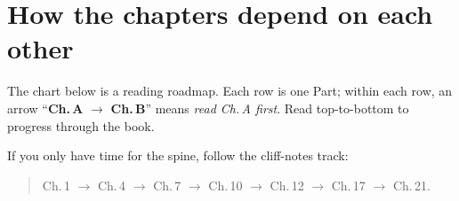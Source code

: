 
\chapter*{How the chapters depend on each other}

The chart below is a reading roadmap. Each row is one Part; within each row, an arrow ``\textbf{Ch.\,A} $\to$ \textbf{Ch.\,B}'' means \emph{read Ch.\,A first}. Read top-to-bottom to progress through the book.

If you only have time for the spine, follow the cliff-notes track:
\begin{quote}
  Ch.\,1 $\to$ Ch.\,4 $\to$ Ch.\,7 $\to$ Ch.\,10 $\to$ Ch.\,12 $\to$ Ch.\,17 $\to$ Ch.\,21.
\end{quote}

\bigskip

